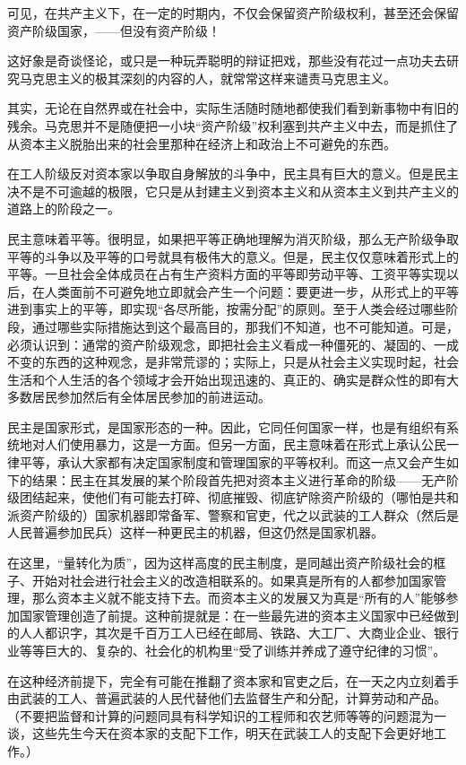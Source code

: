 \documentclass[UTF8, 12pt, a4paper]{ctexrep}
\begin{document}
可见，在共产主义下，在一定的时期内，不仅会保留资产阶级权利，甚至还会保留资产阶级国家，——但没有资产阶级！

这好象是奇谈怪论，或只是一种玩弄聪明的辩证把戏，那些没有花过一点功夫去研究马克思主义的极其深刻的内容的人，就常常这样来谴责马克思主义。

其实，无论在自然界或在社会中，实际生活随时随地都使我们看到新事物中有旧的残余。马克思并不是随便把一小块“资产阶级”权利塞到共产主义中去，而是抓住了从资本主义脱胎出来的社会里那种在经济上和政治上不可避免的东西。

在工人阶级反对资本家以争取自身解放的斗争中，民主具有巨大的意义。但是民主决不是不可逾越的极限，它只是从封建主义到资本主义和从资本主义到共产主义的道路上的阶段之一。

民主意味着平等。很明显，如果把平等正确地理解为消灭阶级，那么无产阶级争取平等的斗争以及平等的口号就具有极伟大的意义。但是，民主仅仅意味着形式上的平等。一旦社会全体成员在占有生产资料方面的平等即劳动平等、工资平等实现以后，在人类面前不可避免地立即就会产生一个问题：要更进一步，从形式上的平等进到事实上的平等，即实现“各尽所能，按需分配”的原则。至于人类会经过哪些阶段，通过哪些实际措施达到这个最高目的，那我们不知道，也不可能知道。可是，必须认识到：通常的资产阶级观念，即把社会主义看成一种僵死的、凝固的、一成不变的东西的这种观念，是非常荒谬的；实际上，只是从社会主义实现时起，社会生活和个人生活的各个领域才会开始出现迅速的、真正的、确实是群众性的即有大多数居民参加然后有全体居民参加的前进运动。

民主是国家形式，是国家形态的一种。因此，它同任何国家一样，也是有组织有系统地对人们使用暴力，这是一方面。但另一方面，民主意味着在形式上承认公民一律平等，承认大家都有决定国家制度和管理国家的平等权利。而这一点又会产生如下的结果：民主在其发展的某个阶段首先把对资本主义进行革命的阶级——无产阶级团结起来，使他们有可能去打碎、彻底摧毁、彻底铲除资产阶级的（哪怕是共和派资产阶级的）国家机器即常备军、警察和官吏，代之以武装的工人群众（然后是人民普遍参加民兵）这样一种更民主的机器，但这仍然是国家机器。

在这里，“量转化为质”，因为这样高度的民主制度，是同越出资产阶级社会的框子、开始对社会进行社会主义的改造相联系的。如果真是所有的人都参加国家管理，那么资本主义就不能支持下去。而资本主义的发展又为真是“所有的人”能够参加国家管理创造了前提。这种前提就是：在一些最先进的资本主义国家中已经做到的人人都识字，其次是千百万工人已经在邮局、铁路、大工厂、大商业企业、银行业等等巨大的、复杂的、社会化的机构里“受了训练并养成了遵守纪律的习惯”。

在这种经济前提下，完全有可能在推翻了资本家和官吏之后，在一天之内立刻着手由武装的工人、普遍武装的人民代替他们去监督生产和分配，计算劳动和产品。（不要把监督和计算的问题同具有科学知识的工程师和农艺师等等的问题混为一谈，这些先生今天在资本家的支配下工作，明天在武装工人的支配下会更好地工作。）
\end{document}
